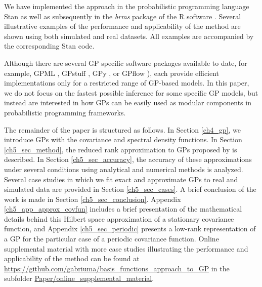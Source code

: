 \documentclass[onecolumn,a4paper,11pt]{article}
\begin{document}

We have implemented the approach in the probabilistic programming language Stan \citep{carpenter2017stan} as well as subsequently in the \textit{brms} package \citep{burkner2017brms} of the R software \citep{R2019R}. Several illustrative examples of the performance and applicability of the method are shown using both simulated and real datasets. All examples are accompanied by the corresponding Stan %
code.

Although there are several GP specific software packages available to date, for example, GPML \citep{rasmussen2010gpml},  GPstuff \citep{vanhatalo2013gpstuff}, GPy \citep{gpy2014}, or GPflow \citep{GPflow2017}), each provide efficient implementations only for a restricted range of GP-based models. In this paper, we do not focus on the fastest possible inference for some specific GP models, but instead are interested in how GPs can be easily used as modular components in probabilistic programming frameworks. 

The remainder of the paper is structured as follows. In Section \ref{ch4_gp}, we introduce GPs with the covariance and spectral density functions. In Section \ref{ch5_sec_method}, the reduced rank approximation to GPs proposed by \cite{solin2018hilbert} is described. In Section \ref{ch5_sec_accuracy}, the accuracy of these approximations under several conditions using analytical and numerical methods is analyzed. Several case studies in which we fit
exact and approximate GPs to real and simulated data are provided in Section \ref{ch5_sec_cases}. A brief conclusion of the work is made in Section \ref{ch5_sec_conclusion}. Appendix \ref{ch5_app_approx_covfun} includes a brief presentation of the mathematical details behind this Hilbert space approximation of a stationary covariance function, and Appendix \ref{ch5_sec_periodic} presents a low-rank representation of a GP for the particular case of a periodic covariance function. 
Online supplemental material with more case studies illustrating the performance and applicability of the method can be found at \url{https://github.com/gabriuma/basis_functions_approach_to_GP} in the subfolder \url{Paper/online_supplemental_material}.
\end{document}
